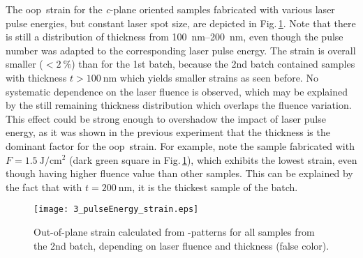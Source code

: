 The \gls{oop}\ strain for the \textit{c}-plane oriented samples fabricated with various laser pulse energies, but constant laser spot size, are depicted in Fig.\,\ref{Fig:Results_3_pulseStrain}.
Note that there is still a distribution of thickness from \qtyrange{100}{200}{\nm}, even though the pulse number was adapted to the corresponding laser pulse energy.
The strain is overall smaller ($<\qty{2}{\percent}$) than for the 1st batch, because the 2nd batch contained samples with thickness $t>\qty{100}{\nm}$ which yields smaller strains as seen before.
No systematic dependence on the laser fluence is observed, which may be explained by the still remaining thickness distribution which overlaps the fluence variation.
This effect could be strong enough to overshadow the impact of laser pulse energy, as it was shown in the previous experiment that the thickness is the dominant factor for the \gls{oop}\ strain.
For example, note the sample fabricated with $F=\qty{1.5}{\J\per\cm\squared}$ (dark green square in Fig.\,\ref{Fig:Results_3_pulseStrain}), which exhibits the lowest strain, even though having higher fluence value than other samples.
This can be explained by the fact that with $t=\qty{200}{\nm}$, it is the thickest sample of the batch.
\begin{figure}
    \centering
    \texttt{[image: 3\_pulseEnergy\_strain.eps]}
    \caption{
        Out-of-plane strain calculated from \thetaomega-patterns for all samples from the 2nd batch, depending on laser fluence and thickness (false color).
    }
    \label{Fig:Results_3_pulseStrain}
\end{figure}

